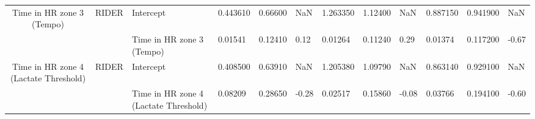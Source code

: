 \begin{tabular}{c}
Time in HR zone 3 (Tempo) & RIDER & Intercept &  0.443610 &  0.66600 &   NaN &   1.263350 &  1.12400 &   NaN &   0.887150 &  0.941900 &   NaN \\
                                      &       & Time in HR zone 3 (Tempo) &   0.01541 &  0.12410 &  0.12 &    0.01264 &  0.11240 &  0.29 &    0.01374 &  0.117200 & -0.67 \\
Time in HR zone 4 (Lactate Threshold) & RIDER & Intercept &  0.408500 &  0.63910 &   NaN &   1.205380 &  1.09790 &   NaN &   0.863140 &  0.929100 &   NaN \\
                                      &       & Time in HR zone 4 (Lactate Threshold) &   0.08209 &  0.28650 & -0.28 &    0.02517 &  0.15860 & -0.08 &    0.03766 &  0.194100 & -0.60 \\
\bottomrule
\end{tabular}
